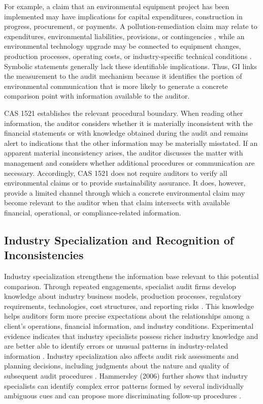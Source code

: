 \documentclass[11pt]{article}
\begin{document}
For example, a claim that an environmental equipment project has been implemented may have implications for capital expenditures, construction in progress, procurement, or payments. 
A pollution-remediation claim may relate to expenditures, environmental liabilities, provisions, or contingencies \citep{barth1994estimation,barth1997factors,li1997corporate}, 
while an environmental technology upgrade may be connected to equipment changes, production processes, operating costs, or industry-specific technical conditions \citep{clarkson2004market}. 
Symbolic statements generally lack these identifiable implications. 
Thus, GI links the measurement to the audit mechanism because it identifies the portion of environmental communication that is more likely to generate a concrete comparison point with information available to the auditor. 

CAS 1521 establishes the relevant procedural boundary.
When reading other information, the auditor considers whether it is materially inconsistent with the financial statements or with knowledge obtained during the audit and remains alert to indications that the other information may be materially misstated.
If an apparent material inconsistency arises, the auditor discusses the matter with management and considers whether additional procedures or communication are necessary.
Accordingly, CAS 1521 does not require auditors to verify all environmental claims or to provide sustainability assurance.
It does, however, provide a limited channel through which a concrete environmental claim may become relevant to the auditor when that claim intersects with available financial, operational, or compliance-related information.

\subsection{Industry Specialization and Recognition of Inconsistencies}

Industry specialization strengthens the information base relevant to this potential comparison.
Through repeated engagements, specialist audit firms develop knowledge about industry business models, production processes, regulatory requirements, technologies, cost structures, and reporting risks \citep{francis2011framework,reichelt2010national}.
This knowledge helps auditors form more precise expectations about the relationships among a client's operations, financial information, and industry conditions.
Experimental evidence indicates that industry specialists possess richer industry knowledge and are better able to identify errors or unusual patterns in industry-related information \citep{solomon1999industry,owhoso2002error}.
Industry specialization also affects audit risk assessments and planning decisions, including judgments about the nature and quality of subsequent audit procedures \citep{low2004effects}.
Hammersley (2006) further shows that industry specialists can identify complex error patterns formed by several individually ambiguous cues and can propose more discriminating follow-up procedures \citep{hammersley2006pattern}.
\end{document}
